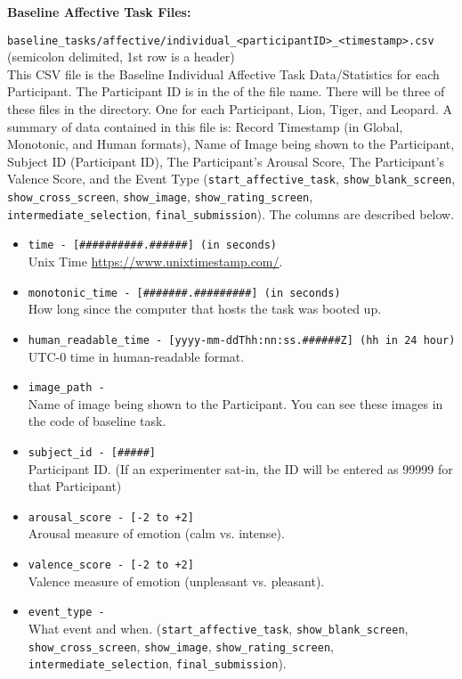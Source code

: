 \begin{description}
\bigskip\item\textbf{Baseline Affective Task Files:}
\medskip
\item\verb|baseline_tasks/affective/individual_<participantID>_<timestamp>.csv|\\
    (semicolon delimited, 1st row is a header)\\
    This CSV file is the Baseline Individual Affective Task Data/Statistics for
    each Participant. The Participant ID is in the of the file name. There will
    be three of these files in the directory. One for each Participant, Lion,
    Tiger, and Leopard. A summary of data contained in this file is: Record
    Timestamp (in Global, Monotonic, and Human formats), Name of Image being
    shown to the Participant, Subject ID (Participant ID), The Participant's
    Arousal Score, The Participant's Valence Score, and the Event Type
    (\verb|start_affective_task|, \verb|show_blank_screen|,
    \verb|show_cross_screen|, \verb|show_image|, \verb|show_rating_screen|,
    \verb|intermediate_selection|, \verb|final_submission|). The columns are
    described below.
    \begin{itemize}
        \item \verb|time - [##########.######] (in seconds)|\\
            Unix Time \url{https://www.unixtimestamp.com/}.
        \item \verb|monotonic_time - [#######.#########] (in seconds)|\\
            How long since the computer that hosts the task was booted up.
        \item \verb|human_readable_time - [yyyy-mm-ddThh:nn:ss.######Z] (hh in 24 hour)|\\
            UTC-0 time in human-readable format.
        \item \verb|image_path -|\\
            Name of image being shown to the Participant. You can see these images in the code of baseline task.
        \item \verb|subject_id - [#####]|\\
            Participant ID. (If an experimenter sat-in, the ID will be entered as 99999 for that Participant)
        \item \verb|arousal_score - [-2 to +2]|\\
            Arousal measure of emotion (calm vs. intense).
        \item \verb|valence_score - [-2 to +2]|\\
            Valence measure of emotion (unpleasant vs. pleasant).
        \item \verb|event_type -|\\
            What event and when.
            (\verb|start_affective_task|, \verb|show_blank_screen|,
            \verb|show_cross_screen|, \verb|show_image|, \verb|show_rating_screen|,
            \verb|intermediate_selection|, \verb|final_submission|).
    \end{itemize}



\end{description}

